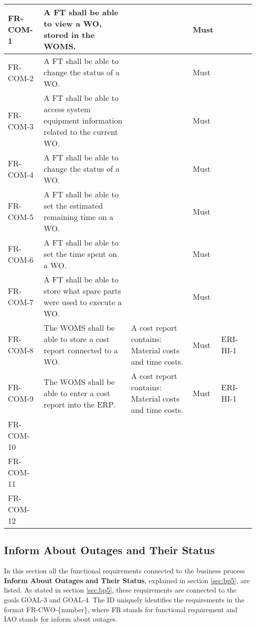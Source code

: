 \begin{center}
\begin{longtable}{|l|p{4cm}|p{4cm}|l|l|l|}
FR-COM-1 & A FT shall be able to view a WO, stored in the WOMS. & & Must & \\ 
\hline
FR-COM-2 & A FT shall be able to change the status of a WO. & & Must & \\ 
\hline
FR-COM-3 & A FT shall be able to access system equipment information related to the current WO. & & Must & \\ 
\hline
FR-COM-4 & A FT shall be able to change the status of a WO. & & Must & \\ 
\hline
FR-COM-5 & A FT shall be able to set the estimated remaining time on a WO. & & Must & \\ 
\hline
FR-COM-6 & A FT shall be able to set the time spent on a WO. & & Must & \\ 
\hline
FR-COM-7 & A FT shall be able to store what spare parts were used to execute a WO. & & Must & \\ 
\hline
FR-COM-8 & The WOMS shall be able to store a cost report connected to a WO. &A cost report contains: Material costs and time costs. & Must & ERI-HI-1 \\ 
\hline
FR-COM-9 & The WOMS shall be able to enter a cost report into the ERP. &A cost report contains: Material costs and time costs. & Must & ERI-HI-1 \\ 
\hline
FR-COM-10& & & & \\
\hline
FR-COM-11& & & & \\
\hline
FR-COM-12& & & & \\
\hline
\end{longtable}
\end{center}


\subsection{Inform About Outages and Their Status}
\label{sub:inform_about_outages}
In this section all the functional requirements connected to the business process \textbf{Inform About Outages and Their Status}, explained in section \ref{sec:bp5}, are listed. As stated in section \ref{sec:bp5}, these requirements are connected to the goals GOAL-3 and GOAL-4. The ID uniquely identifies the requirements in the format FR-CWO-\{number\}, where  FR stands for functional requirement and IAO stands for inform about outages. 



